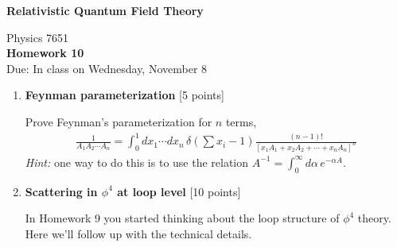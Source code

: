 \documentclass[12pt]{article}
\begin{document}
\vspace*{-1cm}
\begin{center}
{\LARGE \bf Relativistic Quantum Field Theory}

\vspace*{0.5cm}
{\Large Physics 7651} \\
\vspace*{0.5cm}
{\Large {\bf Homework 10}\\
\vspace*{0.5cm}
Due: In class on Wednesday, November 8}
\end{center}



\begin{enumerate}



\item {\bf Feynman parameterization} [5 points]

Prove Feynman's parameterization for $n$ terms,
\begin{align*}
\frac{1}{A_1 A_2\cdots A_n}
=
\int_0^1 dx_1\cdots dx_n 
\, \delta(\sum x_i -1)
\frac{(n-1)!}{\left[x_1 A_1+x_2A_2 + \cdots + x_n A_n\right]^n}
\end{align*}
\textit{Hint:} one way to do this is to use the relation $A^{-1} = \int_0^\infty d\alpha\, e^{-\alpha A}$.

\vspace{.5em}

\item {\bf Scattering in $\phi^4$ at loop level} [10 points]

In Homework 9 you started thinking about the loop structure of $\phi^4$ theory. Here we'll follow up with the technical details. 


\end{enumerate}
\end{document}
